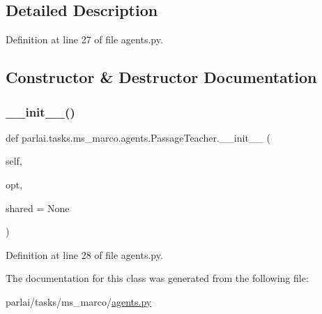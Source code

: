 \subsection{Detailed Description}


Definition at line 27 of file agents.\+py.



\subsection{Constructor \& Destructor Documentation}
\mbox{\label{classparlai_1_1tasks_1_1ms__marco_1_1agents_1_1PassageTeacher_a94976bd31fa3b9da0ea1c7625b22c382}} 
\subsubsection{\texorpdfstring{\+\_\+\+\_\+init\+\_\+\+\_\+()}{\_\_init\_\_()}}
{\footnotesize\ttfamily def parlai.\+tasks.\+ms\+\_\+marco.\+agents.\+Passage\+Teacher.\+\_\+\+\_\+init\+\_\+\+\_\+ (\begin{DoxyParamCaption}\item[{}]{self,  }\item[{}]{opt,  }\item[{}]{shared = {\ttfamily None} }\end{DoxyParamCaption})}



Definition at line 28 of file agents.\+py.



The documentation for this class was generated from the following file\+:\begin{DoxyCompactItemize}
\item 
parlai/tasks/ms\+\_\+marco/\hyperlink{parlai_2tasks_2ms__marco_2agents_8py}{agents.\+py}\end{DoxyCompactItemize}
